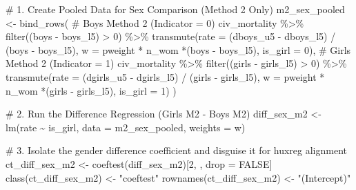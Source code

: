 \documentclass[
  letterpaper,
  DIV=11,
  numbers=noendperiod]{scrartcl}
\newenvironment{Shaded}{\begin{snugshade}}{\end{snugshade}}
\newcommand{\AttributeTok}[1]{\textcolor[rgb]{0.40,0.45,0.13}{#1}}
\newcommand{\CommentTok}[1]{\textcolor[rgb]{0.37,0.37,0.37}{#1}}
\newcommand{\ConstantTok}[1]{\textcolor[rgb]{0.56,0.35,0.01}{#1}}
\newcommand{\DecValTok}[1]{\textcolor[rgb]{0.68,0.00,0.00}{#1}}
\newcommand{\FunctionTok}[1]{\textcolor[rgb]{0.28,0.35,0.67}{#1}}
\newcommand{\NormalTok}[1]{\textcolor[rgb]{0.00,0.23,0.31}{#1}}
\newcommand{\OtherTok}[1]{\textcolor[rgb]{0.00,0.23,0.31}{#1}}
\newcommand{\SpecialCharTok}[1]{\textcolor[rgb]{0.37,0.37,0.37}{#1}}
\newcommand{\StringTok}[1]{\textcolor[rgb]{0.13,0.47,0.30}{#1}}
\begin{document}
\begin{Shaded}
\begin{Highlighting}[]
\CommentTok{\# 1. Create Pooled Data for Sex Comparison (Method 2 Only)}
\NormalTok{m2\_sex\_pooled }\OtherTok{\textless{}{-}} \FunctionTok{bind\_rows}\NormalTok{(}
  \CommentTok{\# Boys Method 2 (Indicator = 0)}
\NormalTok{  civ\_mortality }\SpecialCharTok{\%\textgreater{}\%} 
    \FunctionTok{filter}\NormalTok{((boys }\SpecialCharTok{{-}}\NormalTok{ boys\_l5) }\SpecialCharTok{\textgreater{}} \DecValTok{0}\NormalTok{) }\SpecialCharTok{\%\textgreater{}\%} 
    \FunctionTok{transmute}\NormalTok{(}\AttributeTok{rate =}\NormalTok{ (dboys\_u5 }\SpecialCharTok{{-}}\NormalTok{ dboys\_l5) }\SpecialCharTok{/}\NormalTok{ (boys }\SpecialCharTok{{-}}\NormalTok{ boys\_l5), }\AttributeTok{w =}\NormalTok{ pweight }\SpecialCharTok{*}\NormalTok{ n\_wom }\SpecialCharTok{*}\NormalTok{(boys }\SpecialCharTok{{-}}\NormalTok{ boys\_l5), }\AttributeTok{is\_girl =} \DecValTok{0}\NormalTok{),}
  \CommentTok{\# Girls Method 2 (Indicator = 1)}
\NormalTok{  civ\_mortality }\SpecialCharTok{\%\textgreater{}\%} 
    \FunctionTok{filter}\NormalTok{((girls }\SpecialCharTok{{-}}\NormalTok{ girls\_l5) }\SpecialCharTok{\textgreater{}} \DecValTok{0}\NormalTok{) }\SpecialCharTok{\%\textgreater{}\%} 
    \FunctionTok{transmute}\NormalTok{(}\AttributeTok{rate =}\NormalTok{ (dgirls\_u5 }\SpecialCharTok{{-}}\NormalTok{ dgirls\_l5) }\SpecialCharTok{/}\NormalTok{ (girls }\SpecialCharTok{{-}}\NormalTok{ girls\_l5), }\AttributeTok{w =}\NormalTok{ pweight }\SpecialCharTok{*}\NormalTok{ n\_wom }\SpecialCharTok{*}\NormalTok{(girls }\SpecialCharTok{{-}}\NormalTok{ girls\_l5), }\AttributeTok{is\_girl =} \DecValTok{1}\NormalTok{)}
\NormalTok{)}

\CommentTok{\# 2. Run the Difference Regression (Girls M2 {-} Boys M2)}
\NormalTok{diff\_sex\_m2 }\OtherTok{\textless{}{-}} \FunctionTok{lm}\NormalTok{(rate }\SpecialCharTok{\textasciitilde{}}\NormalTok{ is\_girl, }\AttributeTok{data =}\NormalTok{ m2\_sex\_pooled, }\AttributeTok{weights =}\NormalTok{ w)}

\CommentTok{\# 3. Isolate the gender difference coefficient and disguise it for huxreg alignment}
\NormalTok{ct\_diff\_sex\_m2 }\OtherTok{\textless{}{-}} \FunctionTok{coeftest}\NormalTok{(diff\_sex\_m2)[}\DecValTok{2}\NormalTok{, , drop }\OtherTok{=} \ConstantTok{FALSE}\NormalTok{]}
\FunctionTok{class}\NormalTok{(ct\_diff\_sex\_m2) }\OtherTok{\textless{}{-}} \StringTok{"coeftest"}
\FunctionTok{rownames}\NormalTok{(ct\_diff\_sex\_m2) }\OtherTok{\textless{}{-}} \StringTok{"(Intercept)"}


\end{Highlighting}
\end{Shaded}
\end{document}
